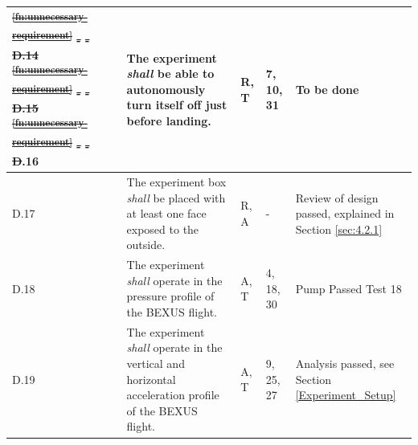 \documentclass[a4paper,12pt,twoside]{article}
\providecommand{\DIFaddtex}[1]{{\protect\color{blue}\uwave{#1}}} %
\providecommand{\DIFdeltex}[1]{{\protect\color{red}\sout{#1}}}                      %
\providecommand{\DIFaddbegin}{} %
\providecommand{\DIFaddend}{} %
\providecommand{\DIFdelend}{} %
\providecommand{\DIFadd}[1]{\texorpdfstring{\DIFaddtex{#1}}{#1}} %
\providecommand{\DIFdel}[1]{\texorpdfstring{\DIFdeltex{#1}}{}} %
\newcommand{\DIFaddincludegraphics}[2][]{{\color{blue}\fbox{\DIFOincludegraphics[#1]{#2}}}} %
\DeclareRobustCommand{\DIFaddbegin}{\DIFOaddbegin \let\includegraphics\DIFaddincludegraphics} %
\DeclareRobustCommand{\DIFaddend}{\DIFOaddend \let\includegraphics\DIFOincludegraphics} %
\DeclareRobustCommand{\DIFdelend}{\DIFOaddend \let\includegraphics\DIFOincludegraphics} %
\begin{document}
\begin{longtable}[]{|m{}| m{} |m{} |m{}|m{}|}
\DIFdel{\textsuperscript{\ref{fn:unnecessary-requirement}}                                                                                }%
\DIFdel{-      }%
\DIFdel{-        }%
\DIFdel{D.14 }%
\DIFdel{\textsuperscript{\ref{fn:unnecessary-requirement}}                                                   }%
\DIFdel{-        }%
\DIFdel{-           }%
\DIFdel{D.15 }%
\DIFdel{\textsuperscript{\ref{fn:unnecessary-requirement}}  }%
\DIFdel{- }%
\DIFdel{-  }%
\DIFdel{D}\DIFdelend .16 & The experiment \textit{shall} be able to autonomously turn itself off just before landing.                                                                                       &       R, T      &  7, 10, 31           &    To be done    \\ \hline
D.17 & The experiment box \textit{shall} be placed with at least one face exposed to the outside.                                                                                &     R, A         & -            &   Review of design passed, explained in Section \ref{sec:4.2.1}     
\\ \hline
D.18 & The  experiment \textit{shall} operate  in  the  pressure  profile  of  the BEXUS flight.\DIFaddbegin \DIFadd{\mbox{%
\cite{BexusManual}                                                                              }\hspace{0pt}%
}\DIFaddend &    A, T         & 4, 18, 30 &  Pump Passed Test 18     
\\ \hline
D.19 & The  experiment \textit{shall} operate  in  the  vertical  and  horizontal  acceleration  profile  of  the BEXUS flight.\DIFaddbegin \DIFadd{\mbox{%
\cite{BexusManual}                                                                              }\hspace{0pt}%
}\DIFaddend &    A, T         & 9, 25, 27            &   Analysis passed, see Section \ref{Experiment_Setup}    
\\ \hline

\end{longtable}
\end{document}
